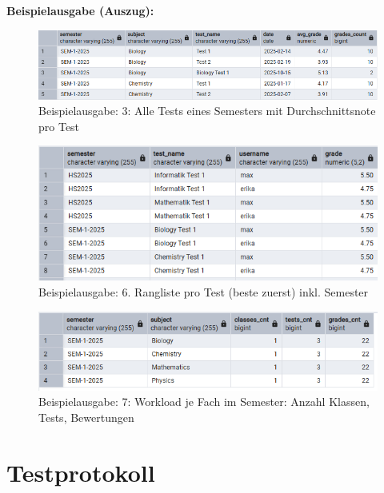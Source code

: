 \documentclass[12pt,a4paper]{article}
\begin{document}
    \textbf{Beispielausgabe (Auszug):}\\
    \begin{figure}[H]
        \centering
        \includegraphics[width=0.95\linewidth]{images/sql_output_3}
        \caption{Beispielausgabe: 3: Alle Tests eines Semesters mit Durchschnittsnote pro Test}
        \label{fig:sql_output_3}
    \end{figure}
    \begin{figure}[H]
        \centering
        \includegraphics[width=0.95\linewidth]{images/sql_output_6}
        \caption{Beispielausgabe: 6. Rangliste pro Test (beste zuerst) inkl. Semester}
        \label{fig:sql_output_6}
    \end{figure}
    \begin{figure}[H]
        \centering
        \includegraphics[width=0.95\linewidth]{images/sql_output_7}
        \caption{Beispielausgabe: 7: Workload je Fach im Semester: Anzahl Klassen, Tests, Bewertungen}
        \label{fig:sql_output_7}
    \end{figure}
    \newpage



    \section{Testprotokoll}
\end{document}
